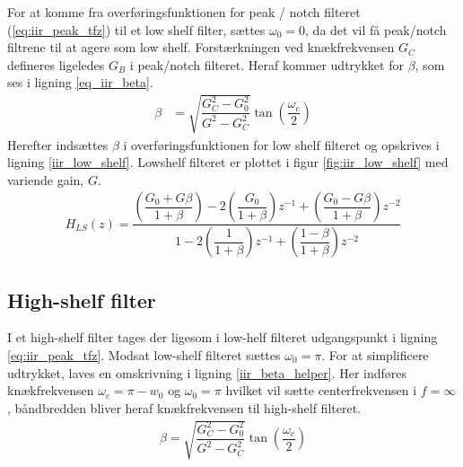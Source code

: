 	For at komme fra overføringsfunktionen for peak / notch filteret (\ref{eq:iir_peak_tfz}) til et low shelf filter, sættes $\omega_0 = 0$, da det vil få peak/notch filtrene til at agere som low shelf. 
	Forstærkningen ved knækfrekvensen $G_C$ defineres ligeledes $G_B$ i peak/notch filteret.
    Heraf kommer udtrykket for $\beta$, som ses i ligning \ref{eq_iir_beta}.
    \begin{align}
        \beta &= \sqrt{\dfrac{G_C^2 - G_0^2}{G^2 - G_C^2}} \tan \left( \dfrac{\omega_c}{2} \right) \label{eq_iir_beta}
    \end{align}
	Herefter indsættes $\beta$ i overføringsfunktionen for low shelf filteret og opskrives i ligning \ref{iir_low_shelf}. Lowshelf filteret er plottet i figur \ref{fig:iir_low_shelf} med variende gain, $G$.
     \begin{align}
      H_{LS}(z) =  \dfrac{\left(\dfrac{G_0 + G \beta}{1 + \beta} \right)- 2 \left(\dfrac{G_0 }{1 +\beta} \right)z^{-1} + \left(\dfrac{ G_0 - G \beta}{1 + \beta }\right) z^{-2}}{1 - 2 \left(\dfrac{1}{1 + \beta}\right)z^{-1} + \left( \dfrac{1 - \beta}{1 + \beta} \right) z^{-2}} \label{iir_low_shelf}
     \end{align}
   
   
     \subsection{High-shelf filter}
	I et high-shelf filter tages der ligesom i low-helf filteret udgangspunkt i ligning \ref{eq:iir_peak_tfz}. Modsat low-shelf filteret sættes $\omega_0 = \pi$.
     For at simplificere udtrykket, laves en omskrivning i ligning \ref{iir_beta_helper}. Her indføres knækfrekvensen $\omega_c = \pi - w_0$ og $\omega_0 = \pi$ hvilket vil sætte centerfrekvensen i $f = \infty$, båndbredden bliver heraf knækfrekvensen til high-shelf filteret.
    \begin{align}
        \beta = \sqrt{\dfrac{G_C^2 - G_0^2}{G^2 - G_C^2}} \tan \left( \dfrac{\omega_c}{2} \right) \label{iir_beta_helper}
    \end{align}



